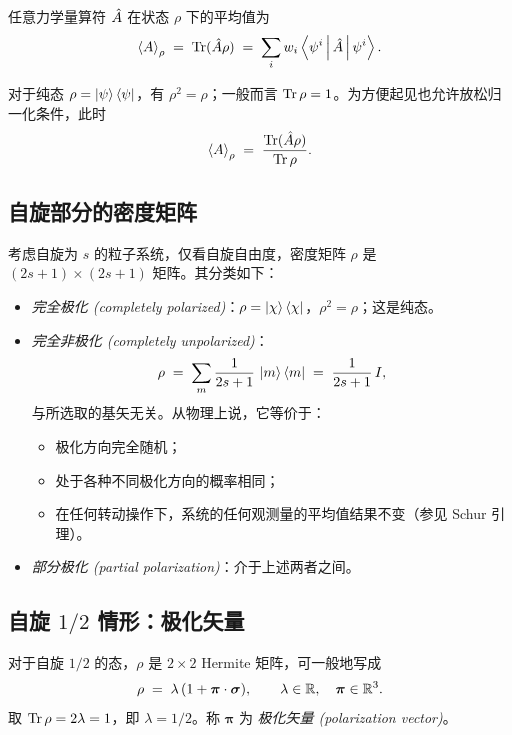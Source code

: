 任意力学量算符 $\hat{A}$ 在状态 $\rho$ 下的平均值为
\begin{equation}
  \expval{A}_\rho \;=\; \operatorname{Tr}(\hat{A}\rho) \;=\; \sum_i w_i \left\langle \psi^i \,\middle|\, \hat{A} \,\middle|\, \psi^i \right\rangle.
  \label{eq:rho-avg}
\end{equation}

对于纯态 $\rho=\ket{\psi}\bra{\psi}$，有 $\rho^2=\rho$；一般而言 $\operatorname{Tr}\rho=1$。为方便起见也允许放松归一化条件，此时
\begin{equation}
  \expval{A}_\rho \;=\; \frac{\operatorname{Tr}(\hat{A}\rho)}{\operatorname{Tr}\rho}.
  \label{eq:rho-avg-normalized}
\end{equation}

\subsection{自旋部分的密度矩阵}

考虑自旋为 $s$ 的粒子系统，仅看自旋自由度，密度矩阵 $\rho$ 是 $(2s+1)\times(2s+1)$ 矩阵。其分类如下：
\begin{itemize}
  \item \emph{完全极化 (completely polarized)}：$\rho=\ket{\chi}\bra{\chi}$，$\rho^2=\rho$；这是纯态。
  \item \emph{完全非极化 (completely unpolarized)}：
  \begin{equation}
    \rho \;=\; \sum_m \frac{1}{2s+1}\,\ket{m}\bra{m} \;=\; \frac{1}{2s+1}\, I,
    \label{eq:unpolarized}
  \end{equation}
  与所选取的基矢无关。从物理上说，它等价于：
  \begin{itemize}
    \item 极化方向完全随机；
    \item 处于各种不同极化方向的概率相同；
    \item 在任何转动操作下，系统的任何观测量的平均值结果不变（参见 Schur 引理）。
  \end{itemize}
  \item \emph{部分极化 (partial polarization)}：介于上述两者之间。
\end{itemize}

\subsection{自旋 $1/2$ 情形：极化矢量}

对于自旋 $1/2$ 的态，$\rho$ 是 $2\times 2$ Hermite 矩阵，可一般地写成
\begin{equation}
  \rho \;=\; \lambda\,(1+\bm{\pi}\cdot\bm{\sigma}), \qquad \lambda\in\mathbb{R},\quad \bm{\pi}\in\mathbb{R}^3.
  \label{eq:spinhalf-rho}
\end{equation}
取 $\operatorname{Tr}\rho=2\lambda=1$，即 $\lambda=1/2$。称 $\bm{\pi}$ 为 \emph{极化矢量 (polarization vector)}。

